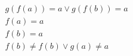 \begin{align*}
%
& g(f(a)) = a \lor g(f(b)) = a
~\\~
& f(a) = a
~\\~
& f(b) = a
~\\~
& f(b)  \neq  f(b) \lor g(a)  \neq  a
%
\end{align*}
